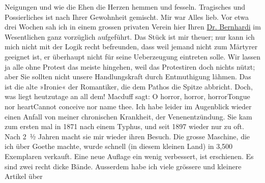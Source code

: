\begin{ledgroupsized}[t]{13cm}
               Neigungen und wie die Ehen die Herzen hemmen und fesseln. Tragisches und
               Possierliches ist nach Ihrer Gewohnheit gemischt. Mir war Alles lieb.\pend
           \pstart
           Vor etwa drei Wochen sah ich in {\pb}einem grossen privaten Verein hier Ihren \uline{Dr. Bernhardi} im Wesentlichen ganz vorzüglich aufgeführt. Das Stück ist mir theuer; nur kann
               ich mich nicht mit der Logik recht befreunden, dass weil jemand nicht zum Märtyrer
               geeignet ist, er überhaupt nicht für seine Ueberzeugung eintreten solle. Wir lassen
               ja alle ohne Protest das meiste hingehen, weil das Protestiren doch nichts nützt;
               aber Sie sollten nicht unsere Handlungskraft durch Entmuthigung lähmen. Das ist die
               alte »Ironie« der Romantiker, die dem Pathos die Spitze abbricht.\pend
           \pstart
           Doch, was liegt heutzutage an all dem! Macduff sagt:\pend
           \stanza{}O horror, horror, horror\newverse{}Tongue nor heart\newverse{}Cannot conceive nor name
                     thee.\stanzaend{}\pstart
           {\pb}Ich habe leider im Augenblick
               wieder einen Anfall von meiner chronischen Krankheit, der Venenentzündung. Sie kam
               zum ersten mal in 1871 nach einem Typhus, und seit 1897
               wieder nur zu oft. Nach 2 ½ Jahren macht sie mir wieder ihren Besuch.\pend
           \pstart
           Die grosse Maschine, die ich
               über Goethe machte, wurde schnell (in diesem
               kleinen Land) in 3,500
               Exemplaren verkauft. Eine neue Auflage ein wenig verbessert, ist erschienen. Es sind
               zwei recht dicke Bände. Ausserdem habe ich viele grössere und kleinere Artikel über

\end{ledgroupsized}
